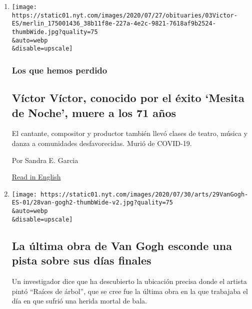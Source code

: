 \begin{enumerate}
\def\labelenumi{\arabic{enumi}.}
\item
  \href{/es/2020/08/03/espanol/cultura/victor-victor-murio-coronavirus.html}{}

  \texttt{[image: https://static01.nyt.com/images/2020/07/27/obituaries/03Victor-ES/merlin\_175001436\_38b11f8e-227a-4e2c-9821-7618af9b2524-thumbWide.jpg?quality=75\\\&auto=webp\\\&disable=upscale]}

  \hypertarget{los-que-hemos-perdido}{%
  \subsubsection{Los que hemos perdido}\label{los-que-hemos-perdido}}

  \hypertarget{vuxedctor-vuxedctor-conocido-por-el-uxe9xito-mesita-de-noche-muere-a-los-71-auxf1os}{%
  \subsection{Víctor Víctor, conocido por el éxito `Mesita de Noche',
  muere a los 71
  años}\label{vuxedctor-vuxedctor-conocido-por-el-uxe9xito-mesita-de-noche-muere-a-los-71-auxf1os}}

  El cantante, compositor y productor también llevó clases de teatro,
  música y danza a comunidades desfavorecidas. Murió de COVID-19.

  Por Sandra E. Garcia

  \href{https://www.nytimes.com/2020/08/01/obituaries/victor-victor-dead-coronavirus.html}{Read
  in English}
\item
  \href{/es/2020/07/29/espanol/cultura/vincent-van-gogh-raices-arbol.html}{}

  \texttt{[image: https://static01.nyt.com/images/2020/07/30/arts/29VanGogh-ES-01/28van-gogh2-thumbWide-v2.jpg?quality=75\\\&auto=webp\\\&disable=upscale]}

  \hypertarget{la-uxfaltima-obra-de-van-gogh-esconde-una-pista-sobre-sus-duxedas-finales}{%
  \subsection{La última obra de Van Gogh esconde una pista sobre sus
  días
  finales}\label{la-uxfaltima-obra-de-van-gogh-esconde-una-pista-sobre-sus-duxedas-finales}}

  Un investigador dice que ha descubierto la ubicación precisa donde el
  artista pintó ``Raíces de árbol'', que se cree fue la última obra en
  la que trabajaba el día en que sufrió una herida mortal de bala.


\end{enumerate}
